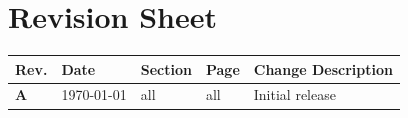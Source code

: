 
\chapter*{Revision Sheet}%
\setcounter{page}{2}

\begin{table}[h!]\scriptsize
	\begin{center}
		\begin{tabular}{|p{0.8cm}|p{2.0cm}|p{2cm}|p{1cm}|p{8cm}|}\hline
			\textbf{Rev. }& \textbf{Date} & \textbf{Section} & \textbf{Page}& \textbf{Change Description} \\ 
			\hline
			
			\textbf{A} & \today & all  & all & Initial release  \\

			\hline
		\end{tabular}
	\end{center}
\end{table}